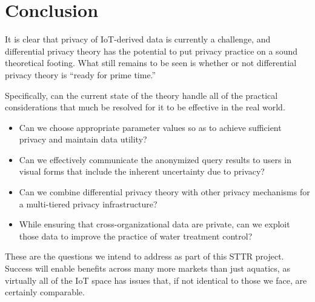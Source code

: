 \section{Conclusion}
\label{sec:conclude}

It is clear that privacy of IoT-derived data is currently a challenge,
and differential privacy theory has the potential to put privacy practice
on a sound theoretical footing.  What still remains to be seen is whether
or not differential privacy theory is ``ready for prime time.''

Specifically, can the current state of the theory handle all of the
practical considerations that much be resolved for it to be effective
in the real world.
\begin{itemize}
\item Can we choose appropriate parameter values so as to achieve
sufficient privacy and maintain data utility?
\item Can we effectively communicate the anonymized query results to
users in visual forms that include the inherent uncertainty due to privacy?
\item Can we combine differential privacy theory with other privacy
mechanisms for a multi-tiered privacy infrastructure?
\item While ensuring that cross-organizational data are private, can we
exploit those data to improve the practice of water treatment control?
\end{itemize}
These are the questions we intend to address as part of this STTR project.
Success will enable benefits across many more markets than just aquatics,
as virtually all of the IoT space has issues that, if not identical to
those we face, are certainly comparable.
